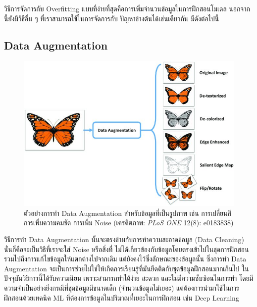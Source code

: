 
วิธีการจัดการกับ Overfitting แบบที่ง่ายที่สุดคือการเพิ่มจำนวนข้อมูลในการฝึกสอนโมเดล นอกจากนี้ยังมีวิธีอื่น ๆ ที่เราสามารถใช้ในการจัดการกับ%
ปัญหาข้างต้นได้เช่นเดียวกัน มีดังต่อไปนี้

\subsection{Data Augmentation}
\label{ssec:data_aug}

\begin{figure}[H]
    \centering
    \includegraphics[width=0.9\linewidth]{fig/data_aug_butterfly.jpg}
    \caption{ตัวอย่างการทำ Data Augmentation สำหรับข้อมูลที่เป็นรูปภาพ เช่น การเปลี่ยนสี การเพิ่มความคมชัด การเพิ่ม Noise 
    (เครดิตภาพ: \textit{PLoS ONE} 12(8): e0183838)}
    \label{fig:data_aug_butterfly}
\end{figure}

วิธีการทำ Data Augmentation นั้นจะตรงข้ามกับการทำความสะอาดข้อมูล (Data Cleaning) นั่นก็คือจะเป็นวิธีที่เราจะใส่ Noise หรือสิ่งที่%
ไม่ได้เกี่ยวข้องกับข้อมูลโดยตรงเข้าไปในชุดการฝึกสอน รวมไปถึงการแก้ไขข้อมูลให้แตกต่างไปจากเดิม แต่ยังคงไว้ซึ่งลักษณะของข้อมูลนั้น 
ซึ่งการทำ Data Augmentation จะเป็นการช่วยไม่ใช่ให้เกิดการเรียนรู้ที่มันยึดติดกับชุดข้อมูลฝึกสอนมากเกินไป ในปัจจุบันวิธีการนี้ได้รับความนิยม%
เพราะสามารถทำได้ง่าย สะดวก และไม่มีความซับซ้อนในการทำ โดยมีความจำเป็นอย่างยิ่งกรณีที่ชุดข้อมูลมีขนาดเล็ก (จำนวนข้อมูลไม่เยอะ) 
แต่ต้องการนำมาใช้ในการฝึกสอนด้วยเทคนิค ML ที่ต้องการข้อมูลในปริมาณที่เยอะในการฝึกสอน เช่น Deep Learning\autocite{bengio2021}

